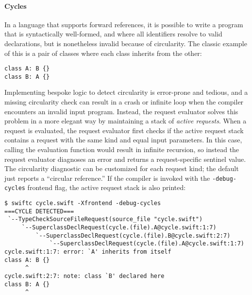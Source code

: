 \documentclass[a4paper,headsepline,bibliography=totoc,toc=flat,fleqn,twoside=semi]{scrbook}
\theoremstyle{definition}
\theoremstyle{definition}
\theoremstyle{definition}
\begin{document}
\paragraph{Cycles} In a language that supports forward references, it is possible to write a program that is syntactically well-formed, and where all identifiers resolve to valid declarations, but is nonetheless invalid because of circularity. The classic example of this is a pair of classes where each class inherits from the other:
\begin{Verbatim}
class A: B {}
class B: A {}
\end{Verbatim}
Implementing bespoke logic to detect circularity is error-prone and tedious, and a missing circularity check can result in a crash or infinite loop when the compiler encounters an invalid input program. Instead, the request evaluator solves this problem in a more elegant way by maintaining a stack of \emph{active requests}. When a request is evaluated, the request evaluator first checks if the active request stack contains a request with the same kind and equal input parameters. In this case, calling the evaluation function would result in infinite recursion, so instead the request evaluator diagnoses an error and returns a request-specific sentinel value. The circularity diagnostic can be customized for each request kind; the default just reports a ``circular reference.'' If the compiler is invoked with the \texttt{-debug-cycles} frontend flag, the active request stack is also printed:
\begin{Verbatim}
$ swiftc cycle.swift -Xfrontend -debug-cycles
===CYCLE DETECTED===
 `--TypeCheckSourceFileRequest(source_file "cycle.swift")
     `--SuperclassDeclRequest(cycle.(file).A@cycle.swift:1:7)
         `--SuperclassDeclRequest(cycle.(file).B@cycle.swift:2:7)
             `--SuperclassDeclRequest(cycle.(file).A@cycle.swift:1:7)
cycle.swift:1:7: error: `A' inherits from itself
class A: B {}
      ^
cycle.swift:2:7: note: class `B' declared here
class B: A {}
      ^
\end{Verbatim}
\end{document}
